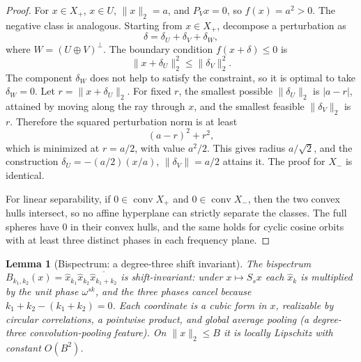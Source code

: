 \documentclass[11pt]{article}
\theoremstyle{plain}
\newtheorem{lemma}{Lemma}
\theoremstyle{definition}
\theoremstyle{remark}
\newcommand{\conv}{\operatorname{conv}}
\begin{document}
\begin{proof}
For $x\in X_+$, $x\in U$, $\|x\|_2=a$, and $P_Vx=0$, so $f(x)=a^2>0$.  The negative class is analogous.  Starting from $x\in X_+$, decompose a perturbation as
\[
\delta=\delta_U+\delta_V+\delta_W,
\]
where $W=(U\oplus V)^\perp$.  The boundary condition $f(x+\delta)\le0$ is
\[
\|x+\delta_U\|_2^2\le \|\delta_V\|_2^2.
\]
The component $\delta_W$ does not help to satisfy the constraint, so it is optimal to take $\delta_W=0$.  Let $r=\|x+\delta_U\|_2$.  For fixed $r$, the smallest possible $\|\delta_U\|_2$ is $|a-r|$, attained by moving along the ray through $x$, and the smallest feasible $\|\delta_V\|_2$ is $r$.  Therefore the squared perturbation norm is at least
\[
(a-r)^2+r^2,
\]
which is minimized at $r=a/2$, with value $a^2/2$.  This gives radius $a/\sqrt2$, and the construction $\delta_U=-(a/2)(x/a)$, $\|\delta_V\|=a/2$ attains it.  The proof for $X_-$ is identical.

For linear separability, if $0\in\conv X_+$ and $0\in\conv X_-$, then the two convex hulls intersect, so no affine hyperplane can strictly separate the classes.  The full spheres have $0$ in their convex hulls, and the same holds for cyclic cosine orbits with at least three distinct phases in each frequency plane.
\end{proof}

\begin{lemma}[Bispectrum: a degree-three shift invariant]\label{lem:bispectrum}
The bispectrum $B_{k_1,k_2}(x)=\hat x_{k_1}\hat x_{k_2}\overline{\hat x_{k_1+k_2}}$ is shift-invariant: under $x\mapsto S_sx$ each $\hat x_k$ is multiplied by the unit phase $\omega^{sk}$, and the three phases cancel because $k_1+k_2-(k_1+k_2)=0$.  Each coordinate is a cubic form in $x$, realizable by circular correlations, a pointwise product, and global average pooling (a degree-three convolution-pooling feature).  On $\|x\|_2\le B$ it is locally Lipschitz with constant $O(B^2)$.
\end{lemma}
\end{document}
